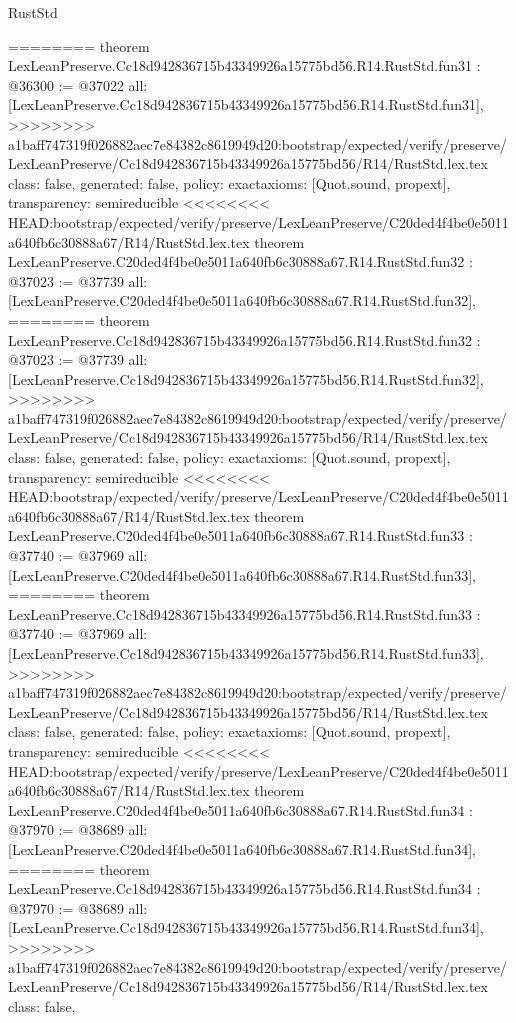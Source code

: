 \begin{lexlean}{RustStd}
\begin{coremodule}
{\begin{coremodule}
{{{{{{{{{{{{{{{{{{{{{{{{{{{{{{{{{{========
theorem LexLeanPreserve.Cc18d942836715b43349926a15775bd56.R14.RustStd.fun31 : @36300 := @37022 {
  all: [LexLeanPreserve.Cc18d942836715b43349926a15775bd56.R14.RustStd.fun31],
>>>>>>>> a1baff747319f026882aec7e84382c8619949d20:bootstrap/expected/verify/preserve/LexLeanPreserve/Cc18d942836715b43349926a15775bd56/R14/RustStd.lex.tex
  class: false,
  generated: false,
  policy: exact{axioms: [Quot.sound, propext]},
  transparency: semireducible
}
<<<<<<<< HEAD:bootstrap/expected/verify/preserve/LexLeanPreserve/C20ded4f4be0e5011a640fb6c30888a67/R14/RustStd.lex.tex
theorem LexLeanPreserve.C20ded4f4be0e5011a640fb6c30888a67.R14.RustStd.fun32 : @37023 := @37739 {
  all: [LexLeanPreserve.C20ded4f4be0e5011a640fb6c30888a67.R14.RustStd.fun32],
========
theorem LexLeanPreserve.Cc18d942836715b43349926a15775bd56.R14.RustStd.fun32 : @37023 := @37739 {
  all: [LexLeanPreserve.Cc18d942836715b43349926a15775bd56.R14.RustStd.fun32],
>>>>>>>> a1baff747319f026882aec7e84382c8619949d20:bootstrap/expected/verify/preserve/LexLeanPreserve/Cc18d942836715b43349926a15775bd56/R14/RustStd.lex.tex
  class: false,
  generated: false,
  policy: exact{axioms: [Quot.sound, propext]},
  transparency: semireducible
}
<<<<<<<< HEAD:bootstrap/expected/verify/preserve/LexLeanPreserve/C20ded4f4be0e5011a640fb6c30888a67/R14/RustStd.lex.tex
theorem LexLeanPreserve.C20ded4f4be0e5011a640fb6c30888a67.R14.RustStd.fun33 : @37740 := @37969 {
  all: [LexLeanPreserve.C20ded4f4be0e5011a640fb6c30888a67.R14.RustStd.fun33],
========
theorem LexLeanPreserve.Cc18d942836715b43349926a15775bd56.R14.RustStd.fun33 : @37740 := @37969 {
  all: [LexLeanPreserve.Cc18d942836715b43349926a15775bd56.R14.RustStd.fun33],
>>>>>>>> a1baff747319f026882aec7e84382c8619949d20:bootstrap/expected/verify/preserve/LexLeanPreserve/Cc18d942836715b43349926a15775bd56/R14/RustStd.lex.tex
  class: false,
  generated: false,
  policy: exact{axioms: [Quot.sound, propext]},
  transparency: semireducible
}
<<<<<<<< HEAD:bootstrap/expected/verify/preserve/LexLeanPreserve/C20ded4f4be0e5011a640fb6c30888a67/R14/RustStd.lex.tex
theorem LexLeanPreserve.C20ded4f4be0e5011a640fb6c30888a67.R14.RustStd.fun34 : @37970 := @38689 {
  all: [LexLeanPreserve.C20ded4f4be0e5011a640fb6c30888a67.R14.RustStd.fun34],
========
theorem LexLeanPreserve.Cc18d942836715b43349926a15775bd56.R14.RustStd.fun34 : @37970 := @38689 {
  all: [LexLeanPreserve.Cc18d942836715b43349926a15775bd56.R14.RustStd.fun34],
>>>>>>>> a1baff747319f026882aec7e84382c8619949d20:bootstrap/expected/verify/preserve/LexLeanPreserve/Cc18d942836715b43349926a15775bd56/R14/RustStd.lex.tex
  class: false,
}}}}}}}}}}}}}}}}}}}}}}}}}}}}}}}}}}}}}}
\end{coremodule}}
\end{coremodule}
\end{lexlean}

